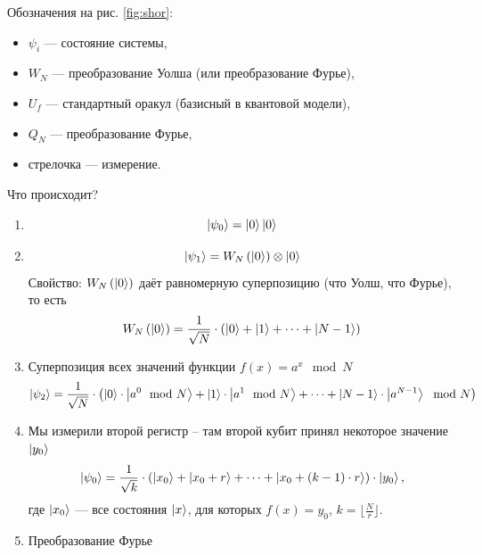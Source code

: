 Обозначения на рис. \ref{fig:shor}:
\begin{itemize}
  \item $\psi_i$ --- состояние системы,
  \item $W_N$ --- преобразование Уолша (или преобразование Фурье),
  \item $U_f$ --- стандартный оракул (базисный в квантовой модели),
  \item $Q_N$ --- преобразование Фурье,
  \item стрелочка --- измерение.
\end{itemize}

Что происходит?
\begin{enumerate}
  \item
    \begin{equation*}
      \left| \psi_0 \right> = \left| 0 \right> \left| 0 \right>
    \end{equation*}
  \item 
    \begin{equation*}
      \left| \psi_1 \right> = W_N\left( \left| 0 \right> \right) \otimes \left| 0 \right>
    \end{equation*}
    Свойство: $W_N\left( \left| 0 \right> \right)$ даёт равномерную суперпозицию
    (что Уолш, что Фурье), то есть
    \begin{equation*}
      W_N\left( \left| 0 \right> \right)
      = \frac{1}{\sqrt{N}}
        \cdot \left( \left| 0 \right> + \left| 1 \right> + \dots + \left| N-1 \right> \right)
    \end{equation*}
  \item 
    Суперпозиция всех значений функции $f\left( x \right) = a^x \mod N$
    \begin{equation*}
      \left| \psi_2 \right> = \frac{1}{\sqrt{N}} \cdot \left( \left| 0 \right> \cdot \left| a^0 \mod N \right> + \left| 1 \right> \cdot \left| a^1 \mod N \right> + \dots + \left| N-1 \right> \cdot \left| a^{N-1} \right> \mod N \right)
    \end{equation*}
  \item Мы измерили второй регистр -- там второй кубит принял некоторое значение
    $\left| y_0 \right>$
    \begin{equation*}
      \left| \psi_0 \right> = \frac{1}{\sqrt{k}} \cdot \left( \left| x_0 \right> + \left| x_0 + r \right> + \dots + \left| x_0 + \left( k-1 \right) \cdot r \right> \right) \cdot \left| y_0 \right>,
    \end{equation*}
    где $\left| x_0 \right>$ --- все состояния $\left| x \right>$, для которых $f\left( x \right) = y_0$, $k = \lfloor \frac{N}{r} \rfloor$.
  \item Преобразование Фурье
    \begin{equation*}

\end{equation*}
\end{enumerate}

